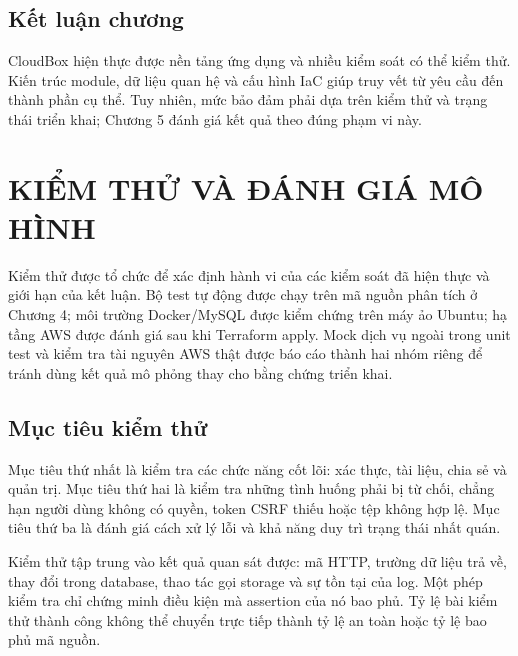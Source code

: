 \section{Kết luận chương}
CloudBox hiện thực được nền tảng ứng dụng và nhiều kiểm soát có thể kiểm thử. Kiến trúc module, dữ liệu quan hệ và cấu hình IaC giúp truy vết từ yêu cầu đến thành phần cụ thể. Tuy nhiên, mức bảo đảm phải dựa trên kiểm thử và trạng thái triển khai; Chương 5 đánh giá kết quả theo đúng phạm vi này.
\chapter{KIỂM THỬ VÀ ĐÁNH GIÁ MÔ HÌNH}
\label{chap:kiemthu}
Kiểm thử được tổ chức để xác định hành vi của các kiểm soát đã hiện thực và giới hạn của kết luận. Bộ test tự động được chạy trên mã nguồn phân tích ở Chương 4; môi trường Docker/MySQL được kiểm chứng trên máy ảo Ubuntu; hạ tầng AWS được đánh giá sau khi Terraform apply. Mock dịch vụ ngoài trong unit test và kiểm tra tài nguyên AWS thật được báo cáo thành hai nhóm riêng để tránh dùng kết quả mô phỏng thay cho bằng chứng triển khai.

\section{Mục tiêu kiểm thử}
Mục tiêu thứ nhất là kiểm tra các chức năng cốt lõi: xác thực, tài liệu, chia sẻ và quản trị. Mục tiêu thứ hai là kiểm tra những tình huống phải bị từ chối, chẳng hạn người dùng không có quyền, token CSRF thiếu hoặc tệp không hợp lệ. Mục tiêu thứ ba là đánh giá cách xử lý lỗi và khả năng duy trì trạng thái nhất quán.

Kiểm thử tập trung vào kết quả quan sát được: mã HTTP, trường dữ liệu trả về, thay đổi trong database, thao tác gọi storage và sự tồn tại của log. Một phép kiểm tra chỉ chứng minh điều kiện mà assertion của nó bao phủ. Tỷ lệ bài kiểm thử thành công không thể chuyển trực tiếp thành tỷ lệ an toàn hoặc tỷ lệ bao phủ mã nguồn.

